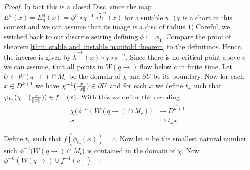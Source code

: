 \begin{proof}
In fact this is a closed Disc, since the map $E^u(x)=E^u_n(x)=\phi^n\circ \chi^{-1} \circ \tilde{h}^n(x)$ for a suitible $n$. ($\chi$ is a chart in this context and we can assume that its image is a disc of radius $1$) Careful, we swiched back to our discrete setting defining $\phi:=\phi_1$. Compare the proof of theorem \ref{thm: stable and unstable manifold theorem} to the definitinos. Hence, the inverse is given by $\tilde{h}^{-n}(x)\circ \chi \circ \phi^{-n}$. Since there is no critical point above $c$ we can assume, that all points in $W(q\to)$ flow below $c$ in finite time. 
Let $U\subset W(q\to)\cap M_c$ be the domain of $\chi$ and $\partial U$ be its boundary. Now for each $x\in D^{k+1}$ we have $\chi^{-1}(\frac{x}{\left\lVert x\right\rVert})\in \partial U$ and for each $x$ we  define $t_x$ such that $\varphi_{t_x}(\chi^{-1}(\frac{x}{\left\lVert x\right\rVert}))\in f^{-1}(x)$. With this we define the rescaling
\begin{align*}
	\chi\big( \phi^{-n}(W(q\to)\cap M_c)\big) & \to 	 \overline{D^{k+1}}\\
	x										  & \mapsto  t_{x}x
\end{align*}

Define $t_x$ such that $f(\phi_{t_x}(x))=c$. Now let $n$ be the smallest natural number such $\phi^{-n}(W(q\to )\cap M_c$) is contained in the domain of $\chi$. Now $\phi^{-n}(W(q\to)\cup f^{-1}(c))$

 \end{proof}
